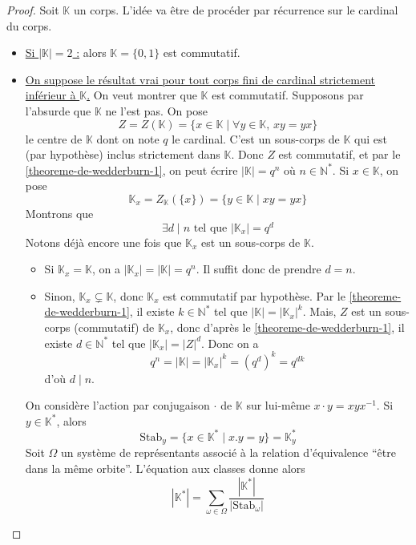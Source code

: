   \begin{proof}
    Soit $\mathbb{K}$ un corps. L'idée va être de procéder par récurrence sur le cardinal du corps.
    \begin{itemize}
      \item \uline{Si $|\mathbb{K}| = 2$ :} alors $\mathbb{K} = \{0, 1\}$ est commutatif.
      \item \uline{On suppose le résultat vrai pour tout corps fini de cardinal strictement inférieur à $\mathbb{K}$.} On veut montrer que $\mathbb{K}$ est commutatif. Supposons par l'absurde que $\mathbb{K}$ ne l'est pas. On pose
      \[ Z = Z(\mathbb{K}) = \{ x \in \mathbb{K} \mid \forall y \in \mathbb{K}, \, xy = yx \} \]
      le centre de $\mathbb{K}$ dont on note $q$ le cardinal. C'est un sous-corps de $\mathbb{K}$ qui est (par hypothèse) inclus strictement dans $\mathbb{K}$. Donc $Z$ est commutatif, et par le \cref{theoreme-de-wedderburn-1}, on peut écrire $|\mathbb{K}| = q^n$ où $n \in \mathbb{N}^*$. Si $x \in \mathbb{K}$, on pose
      \[ \mathbb{K}_x = Z_{\mathbb{K}}(\{ x \}) = \{ y \in \mathbb{K} \mid xy = yx \} \]
      Montrons que
      \[ \exists d \mid n \text{ tel que } |\mathbb{K}_x| = q^d \tag{$*$} \]
      Notons déjà encore une fois que $\mathbb{K}_x$ est un sous-corps de $\mathbb{K}$.
      \begin{itemize}
        \item Si $\mathbb{K}_x = \mathbb{K}$, on a $|\mathbb{K}_x| = |\mathbb{K}| = q^n$. Il suffit donc de prendre $d = n$.
        \item Sinon, $\mathbb{K}_x \subsetneq \mathbb{K}$, donc $\mathbb{K}_x$ est commutatif par hypothèse. Par le \cref{theoreme-de-wedderburn-1}, il existe $k \in \mathbb{N}^*$ tel que $|\mathbb{K}| = |\mathbb{K}_x|^k$.
        \newpar
        Mais, $Z$ est un sous-corps (commutatif) de $\mathbb{K}_x$, donc d'après le \cref{theoreme-de-wedderburn-1}, il existe $d \in \mathbb{N}^*$ tel que $|\mathbb{K}_x| = |Z|^d$. Donc on a
        \[ q^n = |\mathbb{K}| = |\mathbb{K}_x|^k = (q^d)^k = q^{dk} \]
        d'où $d \mid n$.
      \end{itemize}
      On considère l'action par conjugaison $\cdot$ de $\mathbb{K}$ sur lui-même $x \cdot y = xyx^{-1}$. Si $y \in \mathbb{K}^*$, alors
      \[ \mathrm{Stab}_y = \{ x \in \mathbb{K}^* \mid x.y = y \} = \mathbb{K}_y^* \]
      Soit $\Omega$ un système de représentants associé à la relation d'équivalence ``être dans la même orbite''. L'équation aux classes donne alors
      \[ |\mathbb{K}^*| = \sum_{\omega \in \Omega} \frac{|\mathbb{K}^*|}{|\mathrm{Stab}_\omega|} \]

\end{itemize}
\end{proof}
